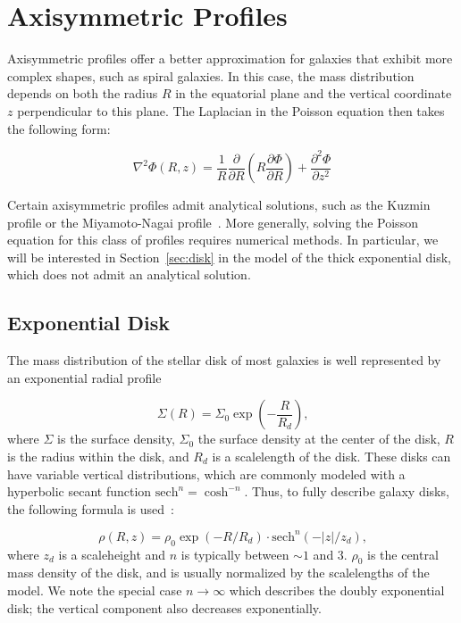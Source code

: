 \section{Axisymmetric Profiles}\label{sec:axisymmetry}

Axisymmetric profiles offer a better approximation for galaxies that exhibit more complex shapes, such as spiral galaxies. In this case, the mass distribution depends on both the radius $R$ in the equatorial plane and the vertical coordinate $z$ perpendicular to this plane. The Laplacian in the Poisson equation then takes the following form:

\begin{equation}
\label{eq:poisson_axisymmetrique}
\nabla^2 \Phi(R, z) = \frac{1}{R}\frac{\partial}{\partial R}\left(R\frac{ \partial \Phi}{\partial R}\right) + \frac{\partial^2\Phi}{\partial z^2}
\end{equation}

Certain axisymmetric profiles admit analytical solutions, such as the Kuzmin profile or the Miyamoto-Nagai profile~\cite{miyamoto1975three}. More generally, solving the Poisson equation for this class of profiles requires numerical methods. In particular, we will be interested in Section~\ref{sec:disk} in the model of the thick exponential disk, which does not admit an analytical solution.

\subsection{Exponential Disk}

The mass distribution of the stellar disk of most galaxies is well represented by an exponential radial profile~\cite{freeman1970disks}

\begin{equation*}
\Sigma(R) = \Sigma_0 \exp{\left(-\frac{R}{R_d}\right)}\text{,}
\end{equation*}
where $\Sigma$ is the surface density, $\Sigma_0$ the surface density at the center of the disk, $R$ is the radius within the disk, and $R_d$ is a scalelength of the disk. These disks can have variable vertical distributions, which are commonly modeled with a hyperbolic secant function $\text{sech}^n = \cosh^{-n}$. Thus, to fully describe galaxy disks, the following formula is used~\cite{smith2015simple}:

\begin{equation}
\label{eq:exp_disk_general}
\rho(R, z) = \rho_0 \exp{\left(-R/R_d\right)}\cdot \text{sech}^n\left(-|z|/z_d\right)\text{,}
\end{equation}
where $z_d$ is a  scaleheight and $n$ is typically between  $\sim 1$ and $3$. $\rho_0$ is the central mass density of the disk, and is usually normalized by the scalelengths of the model. We note the special case $n \rightarrow \infty$ which describes the doubly exponential disk; the vertical component also decreases exponentially.

